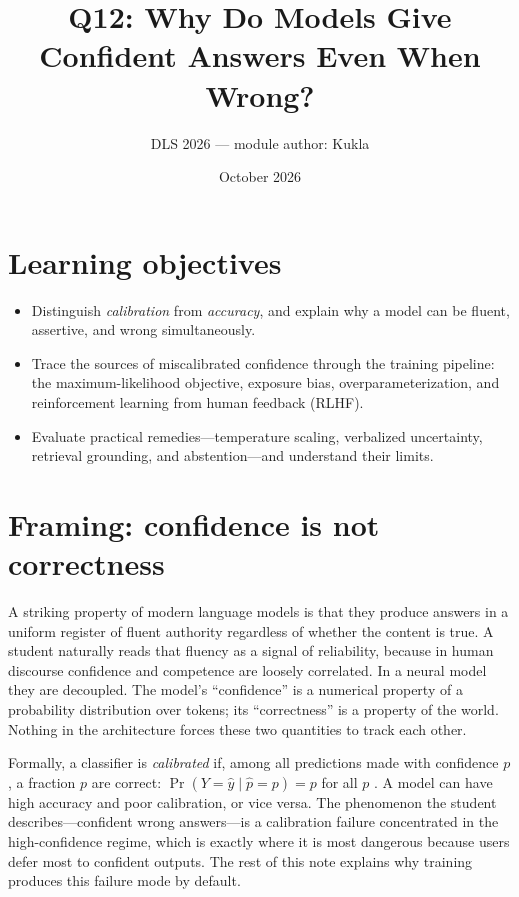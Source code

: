 \documentclass[11pt]{article}
\title{Q12: Why Do Models Give Confident Answers Even When Wrong?}
\author{DLS 2026 --- module author: Kukla}
\date{October 2026}
\begin{document}
\maketitle

\section*{Learning objectives}
\begin{itemize}[leftmargin=*]
  \item Distinguish \emph{calibration} from \emph{accuracy}, and explain why a model can be fluent, assertive, and wrong simultaneously.
  \item Trace the sources of miscalibrated confidence through the training pipeline: the maximum-likelihood objective, exposure bias, overparameterization, and reinforcement learning from human feedback (RLHF).
  \item Evaluate practical remedies---temperature scaling, verbalized uncertainty, retrieval grounding, and abstention---and understand their limits.
\end{itemize}

\section{Framing: confidence is not correctness}
A striking property of modern language models is that they produce answers in a uniform register of fluent authority regardless of whether the content is true. A student naturally reads that fluency as a signal of reliability, because in human discourse confidence and competence are loosely correlated. In a neural model they are decoupled. The model's ``confidence'' is a numerical property of a probability distribution over tokens; its ``correctness'' is a property of the world. Nothing in the architecture forces these two quantities to track each other.

Formally, a classifier is \emph{calibrated} if, among all predictions made with confidence $p$, a fraction $p$ are correct: $\Pr(Y=\hat{y}\mid \hat{p}=p)=p$ for all $p$ \citep{guo2017calibration}. A model can have high accuracy and poor calibration, or vice versa. The phenomenon the student describes---confident wrong answers---is a calibration failure concentrated in the high-confidence regime, which is exactly where it is most dangerous because users defer most to confident outputs. The rest of this note explains why training produces this failure mode by default.
\end{document}

